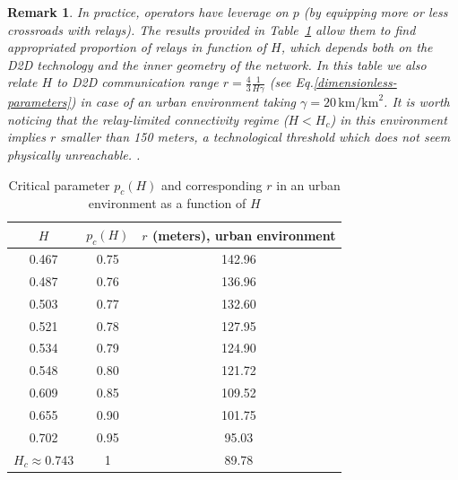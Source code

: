 \documentclass[conference]{IEEEtran}
\newtheorem{remark}{Remark}
\begin{document}
\begin{remark}
In practice, operators have leverage on $p$ (by equipping more or less crossroads with relays). The results provided in Table~\ref{tab-p_c(H)}
allow them to find appropriated proportion of relays
in function of  $H$, which depends both on the D2D technology and the inner geometry of the network. In this table we also relate $H$ to  D2D communication range $r=\frac{4}{3}\frac{1}{H\gamma}$  (see Eq.\eqref{dimensionless-parameters}) in case of an urban environment taking $\gamma = 20 \, \text{km/km}^{2}$. 
It is worth noticing that the  relay-limited connectivity regime 
($H < H_c$)  in this environment implies  $r$ smaller  than 150 meters, a technological threshold which does not seem physically unreachable. \cite{lin_comprehensive_2013}. 
\end{remark}
\begin{table}[t!]
\caption{Critical parameter $p_{c}(H)$ and corresponding $r$ in an urban environment as a function of $H$}
\begin{center}
\begin{tabular}{|c|c|c|}
\hline
$H$ & $p_c(H)$ & $r$ (meters), urban environment \\
\hline
0.467 & 0.75 & 142.96  \\
0.487 & 0.76 & 136.96 \\
0.503 & 0.77 & 132.60 \\
0.521 & 0.78 & 127.95  \\
0.534 & 0.79 & 124.90 \\
0.548 & 0.80 & 121.72  \\
0.609 & 0.85 & 109.52 \\
0.655 & 0.90 & 101.75 \\
0.702 & 0.95  & 95.03 \\
$H_c \approx 0.743$ & 1 & 89.78  \\
\hline
\end{tabular}
\label{tab-p_c(H)}
\end{center}
\end{table}
\end{document}
